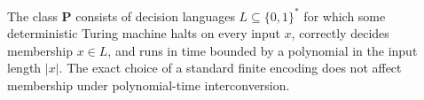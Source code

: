 
The class $\mathbf P$ consists of decision languages $L\subseteq\{0,1\}^*$ for which some deterministic Turing machine halts on every input $x$, correctly decides membership $x\in L$, and runs in time bounded by a polynomial in the input length $|x|$. The exact choice of a standard finite encoding does not affect membership under polynomial-time interconversion.
